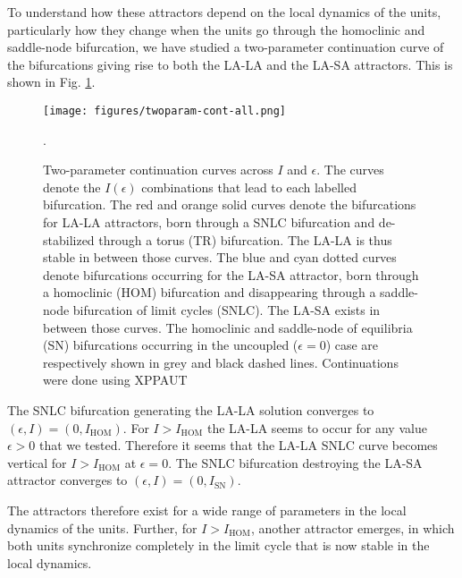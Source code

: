 To understand how these attractors depend on the local dynamics of the units, particularly how they change when the units go through the homoclinic and saddle-node bifurcation, we have studied a two-parameter continuation curve of the bifurcations giving rise to both the LA-LA and the LA-SA attractors. This is shown in Fig. \ref{fig:twoparam-continuation}.
\begin{figure}[h!]
    \centering
    \texttt{[image: figures/twoparam-cont-all.png]}
    \caption{Two-parameter continuation curves across $I$ and $\epsilon$. The curves denote the $I(\epsilon)$ combinations that lead to each labelled bifurcation. The red and orange solid curves denote the bifurcations for LA-LA attractors, born through a SNLC bifurcation and de-stabilized through a torus (TR) bifurcation. The LA-LA is thus stable in between those curves. The blue and cyan dotted curves denote bifurcations occurring for the LA-SA attractor, born through a homoclinic (HOM) bifurcation and disappearing through a saddle-node bifurcation of limit cycles (SNLC). The LA-SA exists in between those curves. The homoclinic and saddle-node of equilibria (SN) bifurcations occurring in the uncoupled ($\epsilon=0$) case are respectively shown in grey and black dashed lines.  Continuations were done using XPPAUT \cite{ermentrout2002simulating}}.
    \label{fig:twoparam-continuation}
\end{figure}


The SNLC bifurcation generating the LA-LA solution converges to $(\epsilon, I) = (0, I_\mathrm{HOM})$. For $I>I_\mathrm{HOM}$ the LA-LA seems to occur for any value $\epsilon > 0$ that we tested. Therefore it seems that the LA-LA SNLC curve becomes vertical for $I>I_\mathrm{HOM}$ at $\epsilon = 0$.
The SNLC bifurcation destroying the LA-SA attractor converges to $(\epsilon, I) = (0, I_\mathrm{SN})$.

The attractors therefore exist for a wide range of parameters in the local dynamics of the units. Further, for $I>I_\mathrm{HOM}$, another attractor emerges, in which both units synchronize completely in the limit cycle that is now stable in the local dynamics. 


